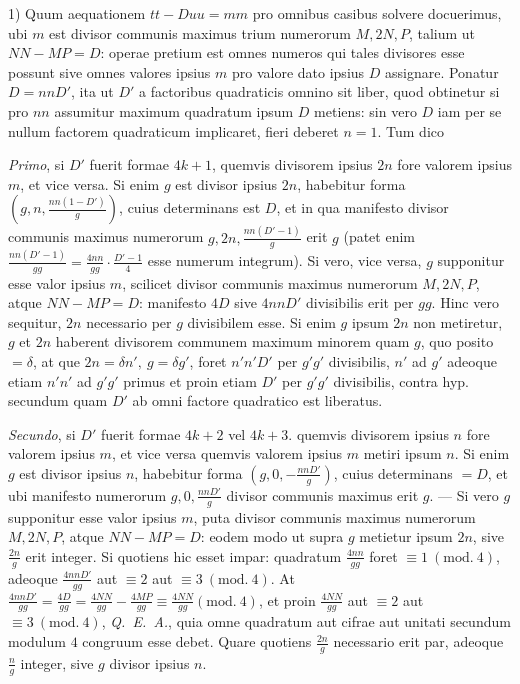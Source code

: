 1) Quum aequationem \(tt-Duu=mm\) pro omnibus casibus solvere docuerimus, ubi \(m\) est divisor communis maximus trium numerorum \(M,2N,P\), talium ut \(NN-MP=D\): operae pretium est omnes numeros qui tales divisores esse possunt sive omnes valores ipsius \(m\) pro valore dato ipsius \(D\) assignare. Ponatur \(D=nnD'\), ita ut \(D'\) a factoribus quadraticis omnino sit liber, quod obtinetur si pro \(nn\) assumitur maximum quadratum ipsum \(D\) metiens: sin vero \(D\) iam per se nullum factorem quadraticum implicaret, fieri deberet \(n=1\). Tum dico

\textit{Primo}, si \(D'\) fuerit formae \(4k+1\), quemvis divisorem ipsius \(2n\) fore valorem ipsius \(m\), et vice versa. Si enim \(g\) est divisor ipsius \(2n\), habebitur forma \(\left(g,n,\frac{nn(1-D')}{g}\right)\), cuius determinans est \(D\), et in qua manifesto divisor communis maximus numerorum \(g,2n,\frac{nn(D'-1)}{g}\) erit \(g\) (patet enim \(\frac{nn(D'-1)}{gg}=\frac{4nn}{gg}\cdot\frac{D'-1}{4}\) esse numerum integrum). Si vero, vice versa, \(g\) supponitur esse valor ipsius \(m\), scilicet divisor communis maximus numerorum \(M,2N,P\), atque \(NN-MP=D\): manifesto \(4D\) sive \(4nnD'\) divisibilis erit per \(gg\). Hinc vero sequitur, \(2n\) necessario per \(g\) divisibilem esse. Si enim \(g\) ipsum \(2n\) non metiretur, \(g\) et \(2n\) haberent divisorem communem maximum minorem quam \(g\), quo posito \(=\delta\), at%
%
que \(2n=\delta n',\ g=\delta g'\), foret \(n'n'D'\) per \(g'g'\) divisibilis, \(n'\) ad \(g'\) adeoque etiam \(n'n'\) ad \(g'g'\) primus et proin etiam \(D'\) per \(g'g'\) divisibilis, contra hyp. secundum quam \(D'\) ab omni factore quadratico est liberatus.

\textit{Secundo}, si \(D'\) fuerit formae \(4k+2\) vel \(4k+3\). quemvis divisorem ipsius \(n\) fore valorem ipsius \(m\), et vice versa quemvis valorem ipsius \(m\) metiri ipsum \(n\). Si enim \(g\) est divisor ipsius \(n\), habebitur forma \(\left(g,0,-\frac{nnD'}{g}\right)\), cuius determinans \(=D\), et ubi manifesto numerorum \(g,0,\frac{nnD'}{g}\) divisor communis maximus erit \(g\). --- Si vero \(g\) supponitur esse valor ipsius \(m\), puta divisor communis maximus numerorum \(M,2N,P\), atque \(NN-MP=D\): eodem modo ut supra \(g\) metietur ipsum \(2n\), sive \(\frac{2n}{g}\) erit integer. Si quotiens hic esset impar: quadratum \(\frac{4nn}{gg}\) foret \(\equiv1\ (\mathrm{mod.}\ 4)\), adeoque \(\frac{4nnD'}{gg}\) aut \(\equiv2\) aut \(\equiv3\ (\mathrm{mod.}\ 4)\). At \(\frac{4nnD'}{gg}=\frac{4D}{gg}=\frac{4NN}{gg}-\frac{4MP}{gg}\equiv\frac{4NN}{gg}(\mathrm{mod.}\ 4)\), et proin \(\frac{4NN}{gg}\) aut \(\equiv2\) aut \(\equiv3\ (\mathrm{mod.}\ 4)\), \textit{Q.~E.~A.}, quia omne quadratum aut cifrae aut unitati secundum modulum \(4\) congruum esse debet. Quare quotiens \(\frac{2n}{g}\) necessario erit par, adeoque \(\frac{n}{g}\) integer, sive \(g\) divisor ipsius \(n\).

